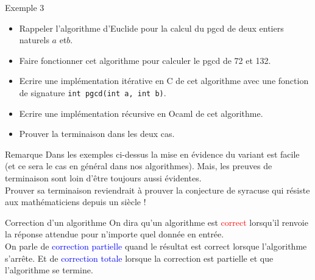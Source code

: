 \documentclass[10pt]{beamer}
\begin{document}
    \begin{frame}[fragile]{\Ctitle}{\stitle}
        \begin{exampleblock}{Exemple 3}
            \begin{itemize}
                \item<1-> Rappeler l'algorithme d'Euclide pour la calcul du {\sc pgcd} de deux entiers naturels $a$ et$b$.
                \item<2-> Faire fonctionner cet algorithme pour calculer le {\sc pgcd} de 72 et 132.
                \item<3-> Ecrire une implémentation itérative en C de cet algorithme avec une fonction de signature \texttt{int pgcd(int a, int b)}.
                \item<4-> Ecrire une implémentation récursive en Ocaml de cet algorithme.
                \item<5-> Prouver la terminaison dans les deux cas.
            \end{itemize}
        \end{exampleblock}
        \end{frame}

    \begin{frame}[fragile]{\Ctitle}{\stitle}
        \begin{block}{Remarque}
            Dans les exemples ci-dessus la mise en évidence du variant est facile (et ce sera le cas en général dans nos algorithmes). Mais, les preuves de terminaison sont loin d'être toujours aussi évidentes.\\
             Prouver sa terminaison reviendrait à prouver la conjecture de syracuse qui résiste aux mathématiciens depuis un siècle !
        \end{block}
    \end{frame}

\begin{frame}[fragile]{\Ctitle}{\stitle}
\begin{alertblock}{\textcolor{gray}{\small \rappel \;}Correction d'un algorithme}
    On dira qu'un algorithme est \textcolor{red}{correct}
     lorsqu'il renvoie la réponse attendue pour n'importe quel donnée en entrée.\\
     On parle de \textcolor{blue}{correction partielle} quand le résultat est correct lorsque l'algorithme s'arrête. Et de \textcolor{blue}{correction totale} lorsque la correction est partielle et que l'algorithme se termine.
\end{alertblock}
\end{frame}
\end{document}
